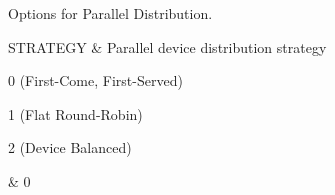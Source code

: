 


\begin{OptionTable}{Options for Parallel Distribution.}
\label{distPKG}

STRATEGY & Parallel device distribution strategy
\begin{XyceItemize}
\item 0 (First-Come, First-Served)
\item 1 (Flat Round-Robin)
\item 2 (Device Balanced)
\end{XyceItemize}
& 0 \\ \hline
\end{OptionTable}

